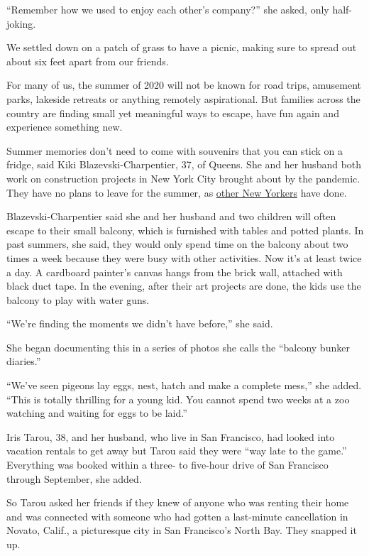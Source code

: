 ``Remember how we used to enjoy each other's company?'' she asked, only
half-joking.

We settled down on a patch of grass to have a picnic, making sure to
spread out about six feet apart from our friends.

For many of us, the summer of 2020 will not be known for road trips,
amusement parks, lakeside retreats or anything remotely aspirational.
But families across the country are finding small yet meaningful ways to
escape, have fun again and experience something new.

Summer memories don't need to come with souvenirs that you can stick on
a fridge, said Kiki Blazevski-Charpentier, 37, of Queens. She and her
husband both work on construction projects in New York City brought
about by the pandemic. They have no plans to leave for the summer, as
\href{https://www.nytimes.com/interactive/2020/05/16/nyregion/nyc-coronavirus-moving-leaving.html}{other
New Yorkers} have done.

Blazevski-Charpentier said she and her husband and two children will
often escape to their small balcony, which is furnished with tables and
potted plants. In past summers, she said, they would only spend time on
the balcony about two times a week because they were busy with other
activities. Now it's at least twice a day. A cardboard painter's canvas
hangs from the brick wall, attached with black duct tape. In the
evening, after their art projects are done, the kids use the balcony to
play with water guns.

``We're finding the moments we didn't have before,'' she said.

She began documenting this in a series of photos she calls the ``balcony
bunker diaries.''

``We've seen pigeons lay eggs, nest, hatch and make a complete mess,''
she added. ``This is totally thrilling for a young kid. You cannot spend
two weeks at a zoo watching and waiting for eggs to be laid.''

Iris Tarou, 38, and her husband, who live in San Francisco, had looked
into vacation rentals to get away but Tarou said they were ``way late to
the game.'' Everything was booked within a three- to five-hour drive of
San Francisco through September, she added.

So Tarou asked her friends if they knew of anyone who was renting their
home and was connected with someone who had gotten a last-minute
cancellation in Novato, Calif., a picturesque city in San Francisco's
North Bay. They snapped it up.

